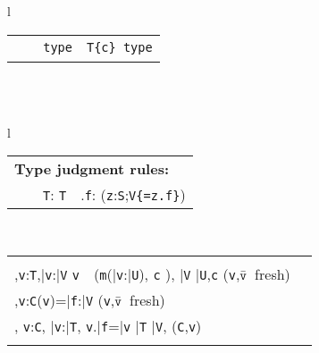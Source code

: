\begin{figure*}
\begin{tabular}{l}
{\begin{tabular}{p{}p{}p{}}
\infrule[Class]
	{\Gamma \vdash \klass({\tt C})}
	{\Gamma \vdash {\tt C}\ \type} 
&
\infrule[Exist-T]
	{\Gamma\tt \vdash {\tt S}\ \type, {\tt T}\ \type}
	{\Gamma\tt \vdash {\tt x:S;T}\ {\tt type}} 
&
\infrule[Dep]
	{\Gamma\tt \vdash T\ \type \andalso \Gamma, \self:T \vdash c:o}
	{\Gamma\tt \vdash T\{c\}\ {\tt type}} 
\\
\end{tabular}}
\quad\\
\quad\\
{\tabcolsep=0pt
\begin{tabular}{l}
\begin{tabular}{p{}p{}p{}}
\multicolumn{3}{l}{\bf Type judgment rules:}\\
\infax[T-Var]
      {\Gamma, {\tt x}:{\tt T} \vdash {\tt x}:{\tt T\{\self==x\}}}
&
\infrule[T-Cast]
	{\Gamma \vdash {\tt e}:{\tt U} \andalso \Gamma \vdash {\tt T} \ \type}
	{\Gamma \vdash {\tt e}\ \as\ {\tt T}: {\tt T}} &
\infrule[T-Field]
	{\Gamma \vdash {\tt e}: {\tt S} \andalso \Gamma,{\tt z}:{\tt S}\vdash {\tt z}\ \has\ {\tt f}:{\tt V} \andalso \mbox{({\tt z} fresh)} }
	{\Gamma \vdash {\tt e}.{\tt f}:  ({\tt z}:{\tt S};{\tt V\{\self=z.f\}})}
\end{tabular}\\
\begin{tabular}{p{}p{}} 
\infrule[T-Invk]
	{\Gamma \vdash {\tt e}:{\tt T},\bar{\tt e}:\bar{\tt V} \andalso \\
	  \Gamma,{\tt v}:{\tt T},\bar{\tt v}:\bar{\tt V} \vdash
		{\tt v}\ \has\ ({\tt m}(\bar{\tt v}:\bar{\tt U}), {\tt c} \rightarrow {\tt S}), 
		\bar{\tt V} \subtype \bar{\tt U},{\tt c} 
	  \andalso \mbox{({\tt v},$\bar{\tt v}$ fresh)}}
	{\Gamma \vdash {\tt e}.{\tt m}(\bar{\tt e}): ({\tt v}:{\tt T};\bar{\tt v}:\bar{\tt V};S)}
	&
\infrule[T-New]
	{\Gamma \vdash \bar{\tt e}:\bar{\tt T} \andalso \vdash \klass({\tt C}) \\ 
	  \Gamma,{\tt v}:{\tt C}\vdash \fields({\tt v})=\bar{\tt f}:\bar{\tt V}  \andalso \mbox{({\tt v},$\bar{\tt v}$\ fresh)}\\
	  \Gamma, {\tt v}:{\tt C}, \bar{\tt v}:\bar{\tt T}, {\tt v}.\bar{\tt f}=\bar{\tt v} 
	  \vdash \bar{\tt T} \subtype \bar{\tt V}, \inv({\tt C},{\tt v})}
	{\Gamma \vdash \new\ {\tt C}(\bar{\tt e}): {\tt C}\{\bar{\tt v}:\bar{\tt T}; \new\ {\tt C}(\bar{\tt v})=\self, \inv({\tt C},\self)\}}\\
\infrule[Method OK]
	{\this:{\tt C}\vdash {\tt c}:o \andalso \this:{\tt C},\bar{\tt x}:\bar{\tt V},{\tt c} \vdash {\tt T} \ \type, \bar{\tt V} \ \type, 
}
\end{tabular}
\end{tabular}}
\end{tabular}
\end{figure*}
